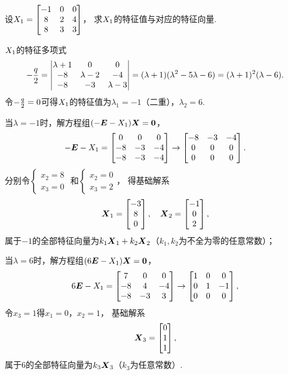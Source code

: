\begin{example}
设\(X_1 = \begin{bmatrix} -1 & 0 & 0 \\ 8 & 2 & 4 \\ 8 & 3 & 3 \end{bmatrix}\)，
求\(X_1\)的特征值与对应的特征向量.
\begin{solution}
\(X_1\)的特征多项式\[
	-\frac{q}{2} = \begin{vmatrix}
		\lambda+1 & 0 & 0 \\
		-8 & \lambda-2 & -4 \\
		-8 & -3 & \lambda-3
	\end{vmatrix}
	= (\lambda+1)(\lambda^2-5\lambda-6)
	= (\lambda+1)^2(\lambda-6).
\]
令\(-\frac{q}{2} = 0\)可得\(X_1\)的特征值为\(\lambda_1=-1\)（二重），\(\lambda_2=6\).

当\(\lambda=-1\)时，解方程组\((-\boldsymbol{E}-X_1)\boldsymbol{X}=\boldsymbol{0}\)，\[
	-\boldsymbol{E}-X_1
	= \begin{bmatrix} 0 & 0 & 0 \\ -8 & -3 & -4 \\ -8 & -3 & -4 \end{bmatrix}
	\to \begin{bmatrix} -8 & -3 & -4 \\ 0 & 0 & 0 \\ 0 & 0 & 0 \end{bmatrix}.
\]
分别令\(\left\{ \begin{array}{l} x_2=8 \\ x_3=0 \end{array} \right.\)
和\(\left\{ \begin{array}{l} x_2=0 \\ x_3=2 \end{array} \right.\)，
得基础解系\[
	\boldsymbol{X}_1 = \begin{bmatrix} -3 \\ 8 \\ 0 \end{bmatrix},
	\quad
	\boldsymbol{X}_2 = \begin{bmatrix} -1 \\ 0 \\ 2 \end{bmatrix},
\]
属于\(-1\)的全部特征向量为\(k_1\boldsymbol{X}_1+k_2\boldsymbol{X}_2\)（\(k_1,k_2\)为不全为零的任意常数）；

当\(\lambda=6\)时，解方程组\((6\boldsymbol{E}-X_1)\boldsymbol{X}=\boldsymbol{0}\)，\[
	6\boldsymbol{E}-X_1 = \begin{bmatrix} 7 & 0 & 0 \\ -8 & 4 & -4 \\ -8 & -3 & 3 \end{bmatrix} \to \begin{bmatrix} 1 & 0 & 0 \\ 0 & 1 & -1 \\ 0 & 0 & 0 \end{bmatrix},
\]
令\(x_3=1\)得\(x_1=0\)，\(x_2=1\)，
基础解系\[
	\boldsymbol{X}_3 = \begin{bmatrix} 0 \\ 1 \\ 1 \end{bmatrix},
\]
属于\(6\)的全部特征向量为\(k_3\boldsymbol{X}_3\)（\(k_3\)为任意常数）.
\end{solution}
\end{example}

